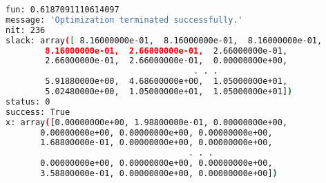 \begin{lstlisting}[language=bash,float=ht,numbers=none,caption={Salida del algoritmo \textit{linprog}},label={lst:output}]
fun: 0.6187091110614097
message: 'Optimization terminated successfully.'
nit: 236
slack: array([ 8.16000000e-01,  8.16000000e-01,  8.16000000e-01,
        8.16000000e-01,  2.66000000e-01,  2.66000000e-01,
        2.66000000e-01,  2.66000000e-01,  0.00000000e+00,
                                      . . .
        5.91880000e+00,  4.68600000e+00,  1.05000000e+01,
        5.02480000e+00,  1.05000000e+01,  1.05000000e+01])
status: 0
success: True
x: array([0.00000000e+00, 1.98800000e-01, 0.00000000e+00,
       0.00000000e+00, 0.00000000e+00, 0.00000000e+00,
       1.68800000e-01, 0.00000000e+00, 0.00000000e+00,
                                     . . .
       0.00000000e+00, 0.00000000e+00, 0.00000000e+00,
       3.58800000e-01, 0.00000000e+00, 0.00000000e+00])
\end{lstlisting}
\\ \\ \\

